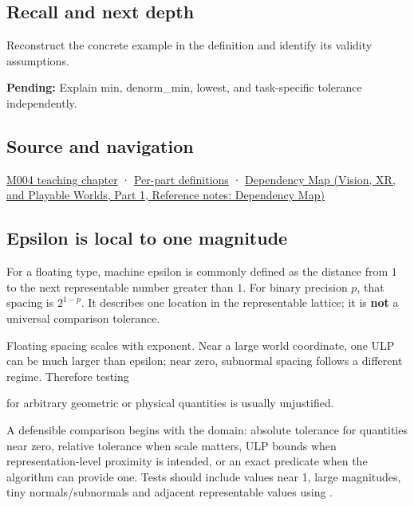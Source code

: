 \subsection{Recall and next depth}\label{appendix-390ea641da54-recall-and-next-depth}

\hypertarget{appendix-390ea641da54-recall-and-next-depth}{}

Reconstruct the concrete example in the definition and identify its validity assumptions.

\textbf{Pending:} Explain min, denorm\_min, lowest, and task-specific tolerance independently.

\subsection{Source and navigation}\label{appendix-390ea641da54-source-and-navigation}

\hypertarget{appendix-390ea641da54-source-and-navigation}{}

\hyperref[01-foundations-i-ch001-a-stretching-ruler-for-real-valued-quantities]{M004 teaching chapter} · \hyperref[appendix-fd090d982a15-m004---parts-61-76]{Per-part definitions} · \href{../07-Vision-XR-and-Playable-Worlds-P01/main.pdf\#appendix-4ad47bdd269a}{Dependency Map (Vision, XR, and Playable Worlds, Part 1, Reference notes: Dependency Map)}

\subsection{Epsilon is local to one magnitude}\label{appendix-390ea641da54-epsilon-is-local-to-one-magnitude}

\hypertarget{appendix-390ea641da54-epsilon-is-local-to-one-magnitude}{}

For a floating type, machine epsilon is commonly defined as the distance from \(1\) to the next representable number greater than \(1\). For binary precision \(p\), that spacing is \(2^{1-p}\). It describes one location in the representable lattice; it is \textbf{not} a universal comparison tolerance.

Floating spacing scales with exponent. Near a large world coordinate, one ULP can be much larger than epsilon; near zero, subnormal spacing follows a different regime. Therefore testing


for arbitrary geometric or physical quantities is usually unjustified.

A defensible comparison begins with the domain: absolute tolerance for quantities near zero, relative tolerance when scale matters, ULP bounds when representation-level proximity is intended, or an exact predicate when the algorithm can provide one. Tests should include values near 1, large magnitudes, tiny normals/subnormals and adjacent representable values using .
